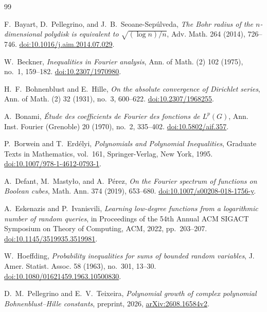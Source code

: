 \documentclass[11pt]{amsart}
\theoremstyle{remark}
\numberwithin{equation}{section}
\begin{document}
\begin{thebibliography}{99}

F.~Bayart, D.~Pellegrino, and J.~B.~Seoane-Sep\'ulveda,
\emph{The Bohr radius of the $n$-dimensional polydisk is equivalent to
$\sqrt{(\log n)/n}$},
Adv. Math. 264 (2014), 726--746.
\href{https://doi.org/10.1016/j.aim.2014.07.029}{doi:10.1016/j.aim.2014.07.029}.

W.~Beckner,
\emph{Inequalities in Fourier analysis},
Ann. of Math. (2) 102 (1975), no.~1, 159--182.
\href{https://doi.org/10.2307/1970980}{doi:10.2307/1970980}.

H.~F.~Bohnenblust and E.~Hille,
\emph{On the absolute convergence of Dirichlet series},
Ann. of Math. (2) 32 (1931), no.~3, 600--622.
\href{https://doi.org/10.2307/1968255}{doi:10.2307/1968255}.

A.~Bonami,
\emph{\'Etude des coefficients de Fourier des fonctions de $L^p(G)$},
Ann. Inst. Fourier (Grenoble) 20 (1970), no.~2, 335--402.
\href{https://doi.org/10.5802/aif.357}{doi:10.5802/aif.357}.

P.~Borwein and T.~Erd\'elyi,
\emph{Polynomials and Polynomial Inequalities},
Graduate Texts in Mathematics, vol.~161, Springer-Verlag, New York, 1995.
\href{https://doi.org/10.1007/978-1-4612-0793-1}{doi:10.1007/978-1-4612-0793-1}.

A.~Defant, M.~Masty\l o, and A.~P\'erez,
\emph{On the Fourier spectrum of functions on Boolean cubes},
Math. Ann. 374 (2019), 653--680.
\href{https://doi.org/10.1007/s00208-018-1756-y}{doi:10.1007/s00208-018-1756-y}.

A.~Eskenazis and P.~Ivanisvili,
\emph{Learning low-degree functions from a logarithmic number of random queries},
in Proceedings of the 54th Annual ACM SIGACT Symposium on Theory of Computing,
ACM, 2022, pp.~203--207.
\href{https://doi.org/10.1145/3519935.3519981}{doi:10.1145/3519935.3519981}.

W.~Hoeffding,
\emph{Probability inequalities for sums of bounded random variables},
J. Amer. Statist. Assoc. 58 (1963), no.~301, 13--30.
\href{https://doi.org/10.1080/01621459.1963.10500830}{doi:10.1080/01621459.1963.10500830}.

D.~M.~Pellegrino and E.~V.~Teixeira,
\emph{Polynomial growth of complex polynomial Bohnenblust--Hille constants},
preprint, 2026, \href{https://arxiv.org/abs/2608.16584v2}{arXiv:2608.16584v2}.


\end{thebibliography}
\end{document}
